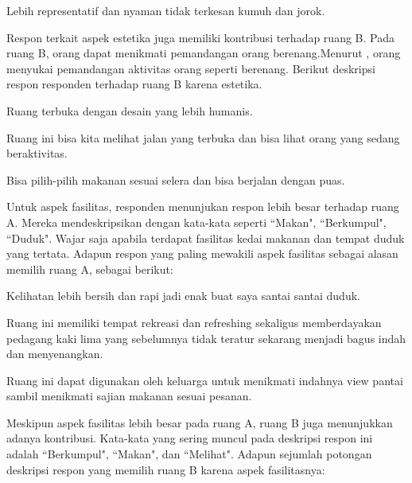\documentclass[11pt]{udthesis} %
\begin{document}
\begin{quoting}
    Lebih representatif dan nyaman tidak terkesan kumuh dan jorok.
\end{quoting}

Respon terkait aspek estetika juga memiliki kontribusi terhadap ruang B. Pada ruang B, orang dapat menikmati pemandangan orang berenang.Menurut \cite{mumcu2016}, orang menyukai pemandangan aktivitas orang seperti berenang. Berikut deskripsi respon responden terhadap ruang B karena estetika.

\begin{quoting}
    Ruang terbuka dengan desain yang lebih humanis.
\end{quoting}

\begin{quoting}
    Ruang ini bisa kita melihat jalan yang terbuka dan bisa lihat orang yang sedang beraktivitas.
\end{quoting}

\begin{quoting}
    Bisa pilih-pilih makanan sesuai selera dan bisa berjalan dengan puas.
\end{quoting}

Untuk aspek fasilitas, responden menunjukan respon lebih besar terhadap ruang A. Mereka mendeskripsikan dengan kata-kata seperti ``Makan", ``Berkumpul", ``Duduk". Wajar saja apabila terdapat fasilitas kedai makanan dan tempat duduk yang tertata. Adapun respon yang paling mewakili aspek fasilitas sebagai alasan memilih ruang A, sebagai berikut:

\begin{quoting}
    Kelihatan lebih bersih dan rapi jadi enak buat saya santai santai duduk.
\end{quoting}

\begin{quoting}
    Ruang ini memiliki tempat rekreasi dan refreshing sekaligus memberdayakan pedagang kaki lima yang sebelumnya tidak teratur sekarang menjadi bagus indah dan menyenangkan.
\end{quoting}

\begin{quoting}
    Ruang ini dapat digunakan oleh keluarga untuk menikmati indahnya view pantai sambil menikmati sajian makanan sesuai pesanan.
\end{quoting}

Meskipun aspek fasilitas lebih besar pada ruang A, ruang B juga menunjukkan adanya kontribusi. Kata-kata yang sering muncul pada deskripsi respon ini adalah ``Berkumpul", ``Makan", dan ``Melihat". Adapun sejumlah potongan deskripsi respon yang memilih ruang B karena aspek fasilitasnya:
\end{document}
